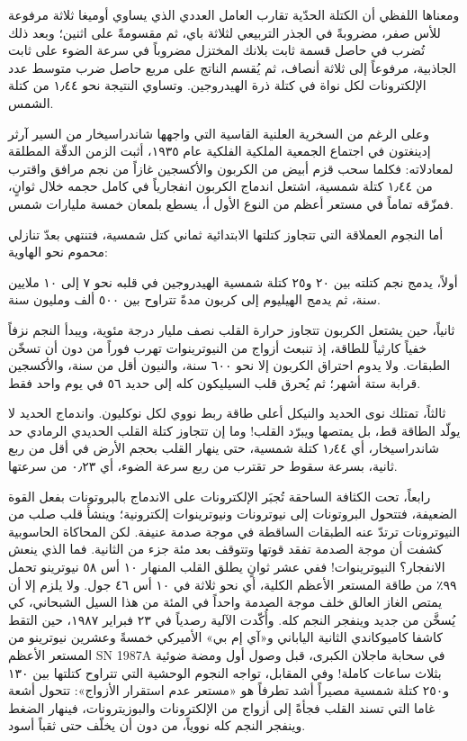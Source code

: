 \documentclass[12pt,a4paper,openany]{book}
\begin{document}
ومعناها اللفظي أن الكتلة الحدّية تقارب العامل العددي الذي يساوي أوميغا ثلاثة مرفوعة للأس صفر، مضروبةً في الجذر التربيعي لثلاثة باي، ثم مقسومةً على اثنين؛ وبعد ذلك تُضرب في حاصل قسمة ثابت بلانك المختزل مضروباً في سرعة الضوء على ثابت الجاذبية، مرفوعاً إلى ثلاثة أنصاف، ثم يُقسم الناتج على مربع حاصل ضرب متوسط عدد الإلكترونات لكل نواة في كتلة ذرة الهيدروجين. وتساوي النتيجة نحو ١٫٤٤ من كتلة الشمس.


وعلى الرغم من السخرية العلنية القاسية التي واجهها شاندراسيخار من السير آرثر إدينغتون في اجتماع الجمعية الملكية الفلكية عام ١٩٣٥، أثبت الزمن الدقّة المطلقة لمعادلاته: فكلما سحب قزم أبيض من الكربون والأكسجين غازاً من نجم مرافق واقترب من ١٫٤٤ كتلة شمسية، اشتعل اندماج الكربون انفجارياً في كامل حجمه خلال ثوانٍ، فمزّقه تماماً في مستعر أعظم من النوع الأول أ، يسطع بلمعان خمسة مليارات شمس.


أما النجوم العملاقة التي تتجاوز كتلتها الابتدائية ثماني كتل شمسية، فتنتهي بعدّ تنازلي محموم نحو الهاوية:


أولاً، يدمج نجم كتلته بين ٢٠ و٢٥ كتلة شمسية الهيدروجين في قلبه نحو ٧ إلى ١٠ ملايين سنة، ثم يدمج الهيليوم إلى كربون مدةً تتراوح بين ٥٠٠ ألف ومليون سنة.


ثانياً، حين يشتعل الكربون تتجاوز حرارة القلب نصف مليار درجة مئوية، ويبدأ النجم نزفاً خفياً كارثياً للطاقة، إذ تنبعث أزواج من النيوترينوات تهرب فوراً من دون أن تسخّن الطبقات. ولا يدوم احتراق الكربون إلا نحو ٦٠٠ سنة، والنيون أقل من سنة، والأكسجين قرابة ستة أشهر؛ ثم يُحرق قلب السيليكون كله إلى حديد ٥٦ في يوم واحد فقط.


ثالثاً، تمتلك نوى الحديد والنيكل أعلى طاقة ربط نووي لكل نوكليون. واندماج الحديد لا يولّد الطاقة قط، بل يمتصها ويبرّد القلب! وما إن تتجاوز كتلة القلب الحديدي الرمادي حد شاندراسيخار، أي ١٫٤٤ كتلة شمسية، حتى ينهار القلب بحجم الأرض في أقل من ربع ثانية، بسرعة سقوط حر تقترب من ربع سرعة الضوء، أي ٠٫٢٣ من سرعتها.


رابعاً، تحت الكثافة الساحقة تُجبَر الإلكترونات على الاندماج بالبروتونات بفعل القوة الضعيفة، فتتحول البروتونات إلى نيوترونات ونيوترينوات إلكترونية؛ وينشأ قلب صلب من النيوترونات ترتدّ عنه الطبقات الساقطة في موجة صدمة عنيفة. لكن المحاكاة الحاسوبية كشفت أن موجة الصدمة تفقد قوتها وتتوقف بعد مئة جزء من الثانية. فما الذي ينعش الانفجار؟ النيوترينوات! ففي عشر ثوانٍ يطلق القلب المنهار ١٠ أس ٥٨ نيوترينو تحمل ٩٩٪ من طاقة المستعر الأعظم الكلية، أي نحو ثلاثة في ١٠ أس ٤٦ جول. ولا يلزم إلا أن يمتص الغاز العالق خلف موجة الصدمة واحداً في المئة من هذا السيل الشبحاني، كي يُسخَّن من جديد وينفجر النجم كله. وأُكّدت الآلية رصدياً في ٢٣ فبراير ١٩٨٧، حين التقط كاشفا كاميوكاندي الثانية الياباني و«آي إم بي» الأميركي خمسةً وعشرين نيوترينو من المستعر الأعظم SN 1987A في سحابة ماجلان الكبرى، قبل وصول أول ومضة ضوئية بثلاث ساعات كاملة! وفي المقابل، تواجه النجوم الوحشية التي تتراوح كتلتها بين ١٣٠ و٢٥٠ كتلة شمسية مصيراً أشد تطرفاً هو «مستعر عدم استقرار الأزواج»: تتحول أشعة غاما التي تسند القلب فجأةً إلى أزواج من الإلكترونات والبوزيترونات، فينهار الضغط وينفجر النجم كله نووياً، من دون أن يخلّف حتى ثقباً أسود.
\end{document}
